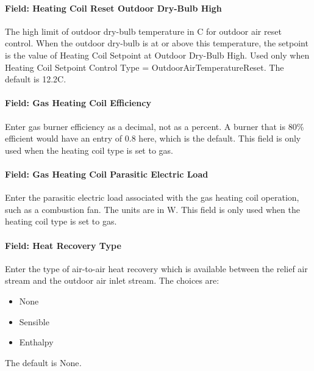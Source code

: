 \paragraph{Field: Heating Coil Reset Outdoor Dry-Bulb High}\label{field-heating-coil-reset-outdoor-dry-bulb-high-2}

The high limit of outdoor dry-bulb temperature in C for outdoor air reset control. When the outdoor dry-bulb is at or above this temperature, the setpoint is the value of Heating Coil Setpoint at Outdoor Dry-Bulb High. Used only when Heating Coil Setpoint Control Type = OutdoorAirTemperatureReset. The default is 12.2C.

\paragraph{Field: Gas Heating Coil Efficiency}\label{field-gas-heating-coil-efficiency-7}

Enter gas burner efficiency as a decimal, not as a percent. A burner that is 80\% efficient would have an entry of 0.8 here, which is the default. This field is only used when the heating coil type is set to gas.

\paragraph{Field: Gas Heating Coil Parasitic Electric Load}\label{field-gas-heating-coil-parasitic-electric-load-7}

Enter the parasitic electric load associated with the gas heating coil operation, such as a combustion fan. The units are in W. This field is only used when the heating coil type is set to gas.

\paragraph{Field: Heat Recovery Type}\label{field-heat-recovery-type-8}

Enter the type of air-to-air heat recovery which is available between the relief air stream and the outdoor air inlet stream. The choices are:

\begin{itemize}
\item
  None
\item
  Sensible
\item
  Enthalpy
\end{itemize}

The default is None\emph{.}

